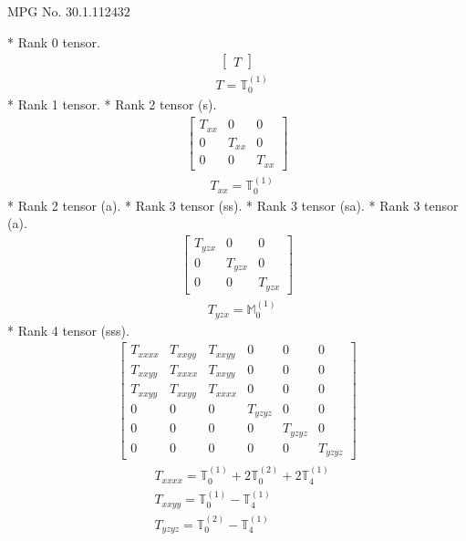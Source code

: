 \documentclass[fleqn,8pt,landscape]{jsarticle}
\begin{document}
\setcounter{MaxMatrixCols}{32}

\renewcommand{\tablename}{Table~}
\renewcommand{\figurename}{Figure~}
\begin{center}
\LARGE
MPG No. 30.1.112\quad$432$
\end{center}
* Rank 0 tensor.
\begin{align*}
\begin{bmatrix} T \end{bmatrix}
\end{align*}
\begin{align*}
& T = \mathbb{T}_{0}^{(1)}
\end{align*}
* Rank 1 tensor.
* Rank 2 tensor (s).
\begin{align*}
\begin{bmatrix} T_{xx} & 0 & 0 \\ 0 & T_{xx} & 0 \\ 0 & 0 & T_{xx} \end{bmatrix}
\end{align*}
\begin{align*}
& T_{xx} = \mathbb{T}_{0}^{(1)}
\end{align*}
* Rank 2 tensor (a).
* Rank 3 tensor (ss).
* Rank 3 tensor (sa).
* Rank 3 tensor (a).
\begin{align*}
\begin{bmatrix} T_{yzx} & 0 & 0 \\ 0 & T_{yzx} & 0 \\ 0 & 0 & T_{yzx} \end{bmatrix}
\end{align*}
\begin{align*}
& T_{yzx} = \mathbb{M}_{0}^{(1)}
\end{align*}
* Rank 4 tensor (sss).
\begin{align*}
\begin{bmatrix} T_{xxxx} & T_{xxyy} & T_{xxyy} & 0 & 0 & 0 \\ T_{xxyy} & T_{xxxx} & T_{xxyy} & 0 & 0 & 0 \\ T_{xxyy} & T_{xxyy} & T_{xxxx} & 0 & 0 & 0 \\ 0 & 0 & 0 & T_{yzyz} & 0 & 0 \\ 0 & 0 & 0 & 0 & T_{yzyz} & 0 \\ 0 & 0 & 0 & 0 & 0 & T_{yzyz} \end{bmatrix}
\end{align*}
\begin{align*}
& T_{xxxx} = \mathbb{T}_{0}^{(1)} + 2 \mathbb{T}_{0}^{(2)} + 2 \mathbb{T}_{4}^{(1)} \\
& T_{xxyy} = \mathbb{T}_{0}^{(1)} - \mathbb{T}_{4}^{(1)} \\
& T_{yzyz} = \mathbb{T}_{0}^{(2)} - \mathbb{T}_{4}^{(1)}
\end{align*}
\end{document}
